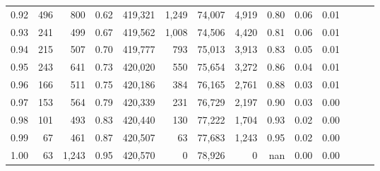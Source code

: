 \begin{tabular}{rrrrrrrrrrrrrr}
0.92 &    496 &    800 &  0.62 &  419,321 &    1,249 &  74,007 &   4,919 &  0.80 &  0.06 &      0.01 \\
0.93 &    241 &    499 &  0.67 &  419,562 &    1,008 &  74,506 &   4,420 &  0.81 &  0.06 &      0.01 \\
0.94 &    215 &    507 &  0.70 &  419,777 &      793 &  75,013 &   3,913 &  0.83 &  0.05 &      0.01 \\
0.95 &    243 &    641 &  0.73 &  420,020 &      550 &  75,654 &   3,272 &  0.86 &  0.04 &      0.01 \\
0.96 &    166 &    511 &  0.75 &  420,186 &      384 &  76,165 &   2,761 &  0.88 &  0.03 &      0.01 \\
0.97 &    153 &    564 &  0.79 &  420,339 &      231 &  76,729 &   2,197 &  0.90 &  0.03 &      0.00 \\
0.98 &    101 &    493 &  0.83 &  420,440 &      130 &  77,222 &   1,704 &  0.93 &  0.02 &      0.00 \\
0.99 &     67 &    461 &  0.87 &  420,507 &       63 &  77,683 &   1,243 &  0.95 &  0.02 &      0.00 \\
1.00 &     63 &  1,243 &  0.95 &  420,570 &        0 &  78,926 &       0 &   nan &  0.00 &      0.00 \\
\bottomrule
\end{tabular}
